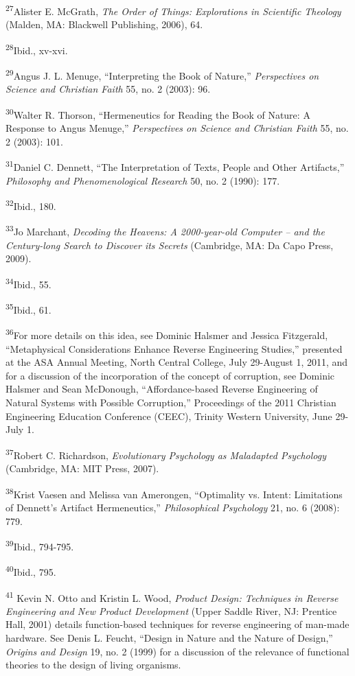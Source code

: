 \textsuperscript{27}Alister E. McGrath, \textit{The Order of Things:
Explorations in Scientific Theology} (Malden, MA: Blackwell Publishing,
2006), 64.


\textsuperscript{28}Ibid., xv-xvi.


\textsuperscript{29}Angus J. L. Menuge, “Interpreting the Book of
Nature,” \textit{Perspectives on Science and Christian Faith} 55, no. 2
(2003): 96.


\textsuperscript{30}Walter R. Thorson, “Hermeneutics for Reading the
Book of Nature: A Response to Angus Menuge,” \textit{Perspectives on
Science and Christian Faith} 55, no. 2 (2003): 101.


\textsuperscript{31}Daniel C. Dennett, “The Interpretation of Texts,
People and Other Artifacts,” \textit{Philosophy and Phenomenological
Research} 50, no. 2 (1990): 177.


\textsuperscript{32}Ibid., 180.


\textsuperscript{33}Jo Marchant, \textit{Decoding the Heavens: A
2000-year-old Computer – and the Century-long Search to Discover its
Secrets} (Cambridge, MA: Da Capo Press, 2009).


\textsuperscript{34}Ibid., 55.


\textsuperscript{35}Ibid., 61.


\textsuperscript{36}For more details on this idea, see Dominic Halsmer
and Jessica Fitzgerald, “Metaphysical Considerations Enhance Reverse
Engineering Studies,” presented at the ASA Annual Meeting, North
Central College, July 29-August 1, 2011, and for a discussion of the
incorporation of the concept of corruption, see Dominic Halsmer and
Sean McDonough, “Affordance-based Reverse Engineering of Natural
Systems with Possible Corruption,” Proceedings of the 2011 Christian
Engineering Education Conference (CEEC), Trinity Western University,
June 29-July 1.


\textsuperscript{37}Robert C. Richardson, \textit{Evolutionary
Psychology as Maladapted Psychology} (Cambridge, MA: MIT Press, 2007).


\textsuperscript{38}Krist Vaesen and Melissa van Amerongen, “Optimality
vs. Intent: Limitations of Dennett’s Artifact Hermeneutics,”
\textit{Philosophical Psychology} 21, no. 6 (2008): 779.


\textsuperscript{39}Ibid., 794-795.


\textsuperscript{40}Ibid., 795.


\textsuperscript{41} Kevin N. Otto and Kristin L. Wood, \textit{Product
Design: Techniques in Reverse Engineering and New Product Development}
(Upper Saddle River, NJ: Prentice Hall, 2001) details function-based
techniques for reverse engineering of man-made hardware. See Denis L.
Feucht, “Design in Nature and the Nature of Design,” \textit{Origins
and Design} 19, no. 2 (1999) for a discussion of the relevance of
functional theories to the design of living organisms.



